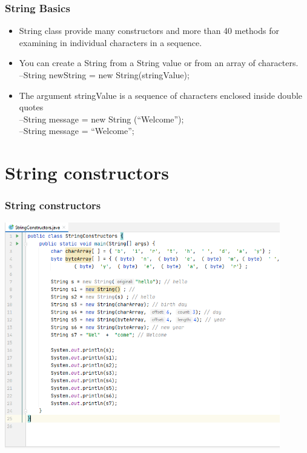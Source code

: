 \documentclass{beamer}
\begin{document}
\begin{frame}
\frametitle{String Basics}
\begin{itemize}
\item String class provide many constructors and more
than 40 methods for examining in individual
characters in a sequence.\\
\item You can create a String from a String value or from an
array of characters.\\
–String newString = new String(stringValue);\\
\item The argument stringValue is a sequence of characters
enclosed inside double quotes\\
–String message = new String (“Welcome”);\\
–String message = “Welcome”;
\end{itemize}
\end{frame}


\section{String constructors}

\begin{frame}
\frametitle{String constructors}
\includegraphics[width=0.9\textwidth]{StringConstructors.png}
\end{frame}



\end{document}
